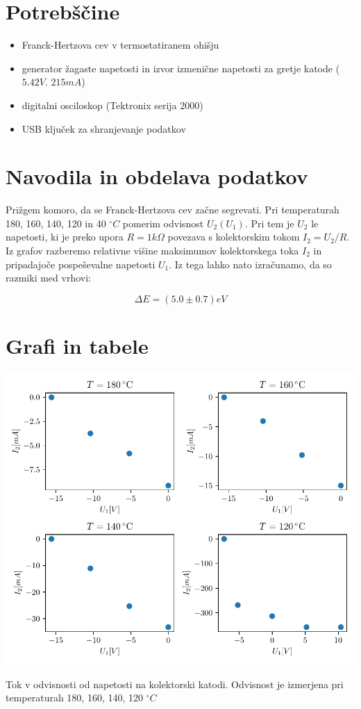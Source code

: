 \documentclass[12pt]{report}
\begin{document}
\begingroup
\let\clearpage\relax

\chapter*{Potrebščine}
\begin{itemize}
  \item Franck-Hertzova cev v termostatiranem ohišju
  \item generator žagaste napetosti in izvor izmenične napetosti za gretje katode ($5.42 \si{V}$. $215\si{mA}$)
  \item digitalni osciloskop (Tektronix serija 2000)
  \item USB ključek za shranjevanje podatkov
\end{itemize}

\chapter*{Navodila in obdelava podatkov }
Prižgem komoro, da se Franck-Hertzova cev začne segrevati. Pri temperaturah 180, 160, 140, 120 in 40 $^\circ C$ pomerim odvisnost $U_2(U_1)$. Pri tem je $U_2$ le napetosti, ki je preko upora $R=1k\Omega$ povezava s kolektorskim tokom $I_2 = U_2 / R $. Iz grafov razberemo relativne višine maksimumov kolektorskega toka $I_2$ in pripadajoče pospeševalne napetosti $U_1$. Iz tega lahko nato izračunamo, da so razmiki med vrhovi: 

\[ \Delta E = (5.0 \pm 0.7) \si{eV}\]
\endgroup

\chapter*{Grafi in tabele}

\begin{slika}[H]
  \centering 
  \includegraphics{grafi.pdf}
  \caption{\small Tok v odvisnosti od napetosti na kolektorski katodi. Odvisnost je izmerjena pri temperaturah 180, 160, 140, 120 $^\circ C$}
\end{slika}
\end{document}
